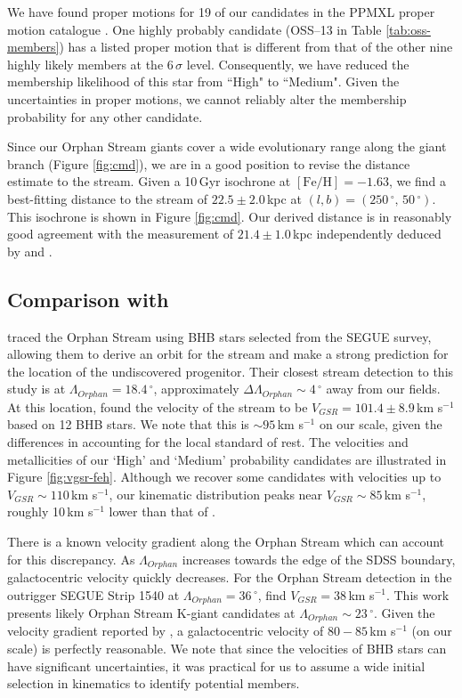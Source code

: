 \documentclass[10pt,apjl]{emulateapj}
\begin{document}
We have found proper motions for 19 of our candidates in the PPMXL proper motion catalogue \citep{Roeser_et-al_2010}. One highly probably candidate (OSS--13 in Table \ref{tab:oss-members}) has a listed proper motion that is different from that of the other nine highly likely members at the $6\,\sigma$ level. Consequently, we have reduced the membership likelihood of this star from ``High" to ``Medium". Given the uncertainties in proper motions, we cannot reliably alter the membership probability for any other candidate.

Since our Orphan Stream giants cover a wide evolutionary range along the giant branch (Figure \ref{fig:cmd}), we are in a good position to revise the distance estimate to the stream. Given a 10\,Gyr \citet{Girardi_et-al_2008} isochrone at $[\mbox{Fe/H}] = -1.63$, we find a best-fitting distance to the stream of $22.5 \pm 2.0$\,kpc at $(l, b) = (250\,^\circ,\,50\,^\circ)$. This isochrone is shown in Figure \ref{fig:cmd}. Our derived distance is in reasonably good agreement with the measurement of $21.4 \pm 1.0$\,kpc independently deduced by \citet{Grillmair_2006} and \citet{Newberg_et-al_2010}.


\subsection{Comparison with \citet{Newberg_et-al_2010}}
\label{sec:newberg}
\citet{Newberg_et-al_2010} traced the Orphan Stream using BHB stars selected from the SEGUE survey, allowing them to derive an orbit for the stream and make a strong prediction for the location of the undiscovered progenitor. Their closest stream detection to this study is at $\Lambda_{Orphan} = 18.4\,^\circ$, approximately $\Delta\Lambda_{Orphan} \sim 4\,^\circ$ away from our fields. At this location, \citet{Newberg_et-al_2010} found the velocity of the stream to be $V_{GSR} = 101.4 \pm 8.9$\,km s$^{-1}$ based on 12 BHB stars. We note that this is $\sim95$\,km s$^{-1}$ on our scale, given the differences in accounting for the local standard of rest. The velocities and metallicities of our `High' and `Medium' probability candidates are illustrated in Figure \ref{fig:vgsr-feh}. Although we recover some candidates with velocities up to $V_{GSR} \sim 110$\,km s$^{-1}$, our kinematic distribution peaks near $V_{GSR} \sim 85$\,km s$^{-1}$, roughly 10\,km s$^{-1}$ lower than that of \citet{Newberg_et-al_2010}.

There is a known velocity gradient along the Orphan Stream which can account for this discrepancy. As $\Lambda_{Orphan}$ increases towards the edge of the SDSS boundary, galactocentric velocity quickly decreases. For the Orphan Stream detection in the outrigger SEGUE Strip 1540 at $\Lambda_{Orphan} = 36\,^\circ$, \citet{Newberg_et-al_2010} find $V_{GSR} = 38$\,km s$^{-1}$. This work presents likely Orphan Stream K-giant candidates at $\Lambda_{Orphan} \sim 23\,^\circ$. Given the velocity gradient reported by \citet{Newberg_et-al_2010}, a galactocentric velocity of $80-85$\,km s$^{-1}$ (on our scale) is perfectly reasonable. We note that since the velocities of BHB stars can have significant uncertainties, it was practical for us to assume a wide initial selection in kinematics to identify potential members. 
\end{document}
